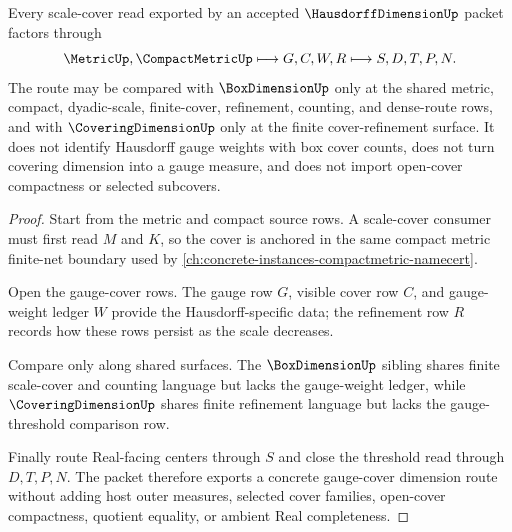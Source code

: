 \begin{theorem}
\label{thm:hausdorff-dimension-scale-cover-route}
Every scale-cover read exported by an accepted $\HausdorffDimensionUp$ packet factors through
$$
\MetricUp,\CompactMetricUp \longmapsto G,C,W,R \longmapsto S,D,T,P,N .
$$
The route may be compared with $\BoxDimensionUp$ only at the shared metric, compact, dyadic-scale, finite-cover, refinement, counting, and dense-route rows, and with $\CoveringDimensionUp$ only at the finite cover-refinement surface. It does not identify Hausdorff gauge weights with box cover counts, does not turn covering dimension into a gauge measure, and does not import open-cover compactness or selected subcovers.
\end{theorem}
\begin{proof}
Start from the metric and compact source rows. A scale-cover consumer must first read $M$ and $K$, so the cover is anchored in the same compact metric finite-net boundary used by \autoref{ch:concrete-instances-compactmetric-namecert}.

Open the gauge-cover rows. The gauge row $G$, visible cover row $C$, and gauge-weight ledger $W$ provide the Hausdorff-specific data; the refinement row $R$ records how these rows persist as the scale decreases.

Compare only along shared surfaces. The $\BoxDimensionUp$ sibling shares finite scale-cover and counting language but lacks the gauge-weight ledger, while $\CoveringDimensionUp$ shares finite refinement language but lacks the gauge-threshold comparison row.

Finally route Real-facing centers through $S$ and close the threshold read through $D,T,P,N$. The packet therefore exports a concrete gauge-cover dimension route without adding host outer measures, selected cover families, open-cover compactness, quotient equality, or ambient Real completeness.
\end{proof}

